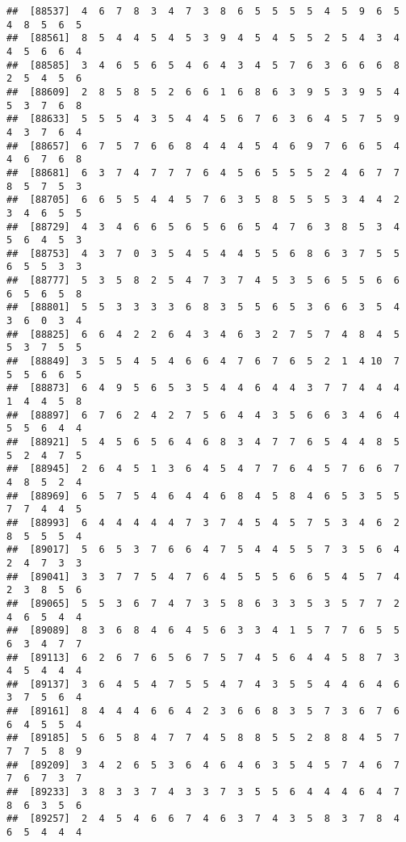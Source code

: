 \documentclass[
]{book}
\begin{document}
\begin{verbatim}
##  [88537]  4  6  7  8  3  4  7  3  8  6  5  5  5  5  4  5  9  6  5  4  8  5  6  5
##  [88561]  8  5  4  4  5  4  5  3  9  4  5  4  5  5  2  5  4  3  4  4  5  6  6  4
##  [88585]  3  4  6  5  6  5  4  6  4  3  4  5  7  6  3  6  6  6  8  2  5  4  5  6
##  [88609]  2  8  5  8  5  2  6  6  1  6  8  6  3  9  5  3  9  5  4  5  3  7  6  8
##  [88633]  5  5  5  4  3  5  4  4  5  6  7  6  3  6  4  5  7  5  9  4  3  7  6  4
##  [88657]  6  7  5  7  6  6  8  4  4  4  5  4  6  9  7  6  6  5  4  4  6  7  6  8
##  [88681]  6  3  7  4  7  7  7  6  4  5  6  5  5  5  2  4  6  7  7  8  5  7  5  3
##  [88705]  6  6  5  5  4  4  5  7  6  3  5  8  5  5  5  3  4  4  2  3  4  6  5  5
##  [88729]  4  3  4  6  6  5  6  5  6  6  5  4  7  6  3  8  5  3  4  5  6  4  5  3
##  [88753]  4  3  7  0  3  5  4  5  4  4  5  5  6  8  6  3  7  5  5  6  5  5  3  3
##  [88777]  5  3  5  8  2  5  4  7  3  7  4  5  3  5  6  5  5  6  6  6  5  6  5  8
##  [88801]  5  5  3  3  3  3  6  8  3  5  5  6  5  3  6  6  3  5  4  3  6  0  3  4
##  [88825]  6  6  4  2  2  6  4  3  4  6  3  2  7  5  7  4  8  4  5  5  3  7  5  5
##  [88849]  3  5  5  4  5  4  6  6  4  7  6  7  6  5  2  1  4 10  7  5  5  6  6  5
##  [88873]  6  4  9  5  6  5  3  5  4  4  6  4  4  3  7  7  4  4  4  1  4  4  5  8
##  [88897]  6  7  6  2  4  2  7  5  6  4  4  3  5  6  6  3  4  6  4  5  5  6  4  4
##  [88921]  5  4  5  6  5  6  4  6  8  3  4  7  7  6  5  4  4  8  5  5  2  4  7  5
##  [88945]  2  6  4  5  1  3  6  4  5  4  7  7  6  4  5  7  6  6  7  4  8  5  2  4
##  [88969]  6  5  7  5  4  6  4  4  6  8  4  5  8  4  6  5  3  5  5  7  7  4  4  5
##  [88993]  6  4  4  4  4  4  7  3  7  4  5  4  5  7  5  3  4  6  2  8  5  5  5  4
##  [89017]  5  6  5  3  7  6  6  4  7  5  4  4  5  5  7  3  5  6  4  2  4  7  3  3
##  [89041]  3  3  7  7  5  4  7  6  4  5  5  5  6  6  5  4  5  7  4  2  3  8  5  6
##  [89065]  5  5  3  6  7  4  7  3  5  8  6  3  3  5  3  5  7  7  2  4  6  5  4  4
##  [89089]  8  3  6  8  4  6  4  5  6  3  3  4  1  5  7  7  6  5  5  6  3  4  7  7
##  [89113]  6  2  6  7  6  5  6  7  5  7  4  5  6  4  4  5  8  7  3  4  5  4  4  4
##  [89137]  3  6  4  5  4  7  5  5  4  7  4  3  5  5  4  4  6  4  6  3  7  5  6  4
##  [89161]  8  4  4  4  6  6  4  2  3  6  6  8  3  5  7  3  6  7  6  6  4  5  5  4
##  [89185]  5  6  5  8  4  7  7  4  5  8  8  5  5  2  8  8  4  5  7  7  7  5  8  9
##  [89209]  3  4  2  6  5  3  6  4  6  4  6  3  5  4  5  7  4  6  7  7  6  7  3  7
##  [89233]  3  8  3  3  7  4  3  3  7  3  5  5  6  4  4  4  6  4  7  8  6  3  5  6
##  [89257]  2  4  5  4  6  6  7  4  6  3  7  4  3  5  8  3  7  8  4  6  5  4  4  4

\end{verbatim}
\end{document}
